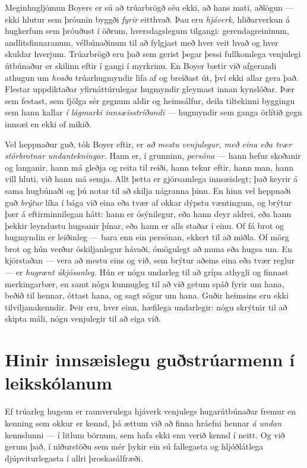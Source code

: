 Meginhugljómun Boyers er sú að trúarbrögð séu ekki, að hans mati, aðlögun — ekki hlutur sem þróunin byggði \emph{fyrir} eitthvað. Þau eru \emph{hjáverk,} hliðarverkun á hugkerfum sem þróuðust í öðrum, hversdagslegum tilgangi: gerendagreininum, andlitsfinnaranum, vélbúnaðinum til að fylgjast með hver veit hvað og hver skuldar hverjum. Trúarbrögð eru það sem gerist þegar þessi fullkomlega venjulegi útbúnaður er skilinn eftir í gangi í myrkrinu. En Boyer bætir við afgerandi athugun um \emph{hvaða} trúarhugmyndir lifa af og breiðast út, því ekki allar gera það. Flestar uppdiktaðar yfirnáttúrulegar hugmyndir gleymast innan kynslóðar. Þær sem festast, sem fjölga sér gegnum aldir og heimsálfur, deila tiltekinni byggingu sem hann kallar \emph{í lágmarki innsæisstríðandi} — hugmyndir sem ganga örlítið gegn innsæi en ekki of mikið.

Vel heppnaður guð, tók Boyer eftir, er \emph{að mestu venjulegur, með eina eða tvær stórbrotnar undantekningar.} Hann er, í grunninn, \emph{persóna} — hann hefur skoðanir og langanir, hann má gleðja og reita til reiði, hann tekur eftir, hann man, hann vill hluti, við hann má semja. Allt þetta er gjörsamlega innsæislegt; það keyrir á sama hugbúnaði og þú notar til að skilja nágranna þinn. En hinn vel heppnaði guð \emph{brýtur} líka í bága við eina eða tvær af okkar dýpstu væntingum, og brýtur þær á eftirminnilegan hátt: hann er ósýnilegur, eða hann deyr aldrei, eða hann þekkir leyndustu hugsanir þínar, eða hann er alls staðar í einu. Of fá brot og hugmyndin er leiðinleg — bara enn ein persónan, ekkert til að miðla. Of mörg brot og hún verður óskiljanlegur hávaði, ómögulegt að muna eða hugsa um. En kjörstaðan — vera að mestu eins og við, sem brýtur aðeins eina eða tvær reglur — er \emph{hugrænt ákjósanleg.} Hún er nógu undarleg til að grípa athygli og finnast merkingarbær, en samt nógu kunnugleg til að við getum spáð fyrir um hana, beðið til hennar, óttast hana, og sagt sögur um hana. Guðir heimsins eru ekki tilviljanakenndir. Þeir eru, hver einn, hæfilega undarlegir: nógu skrýtnir til að skipta máli, nógu venjulegir til að eiga við.

\section*{Hinir innsæislegu guðstrúarmenn í leikskólanum}

Ef trúarleg hugsun er raunverulega hjáverk venjulegs hugarútbúnaðar fremur en kenning sem okkur er kennd, þá ættum við að finna hráefni hennar \emph{á undan} kennslunni — í litlum börnum, sem hafa ekki enn verið kennd í neitt. Og við gerum það, í niðurstöðu sem mér þykir ein sú fallegasta og hljóðlátlega djúpviturlegasta í allri þroskasálfræði.

